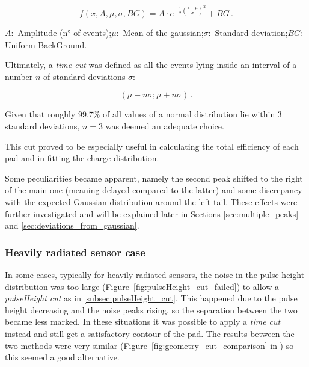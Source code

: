 \begin{equation*}
    f(x,A,\mu,\sigma,BG) = A \cdot e^{-\frac{1}{2}\left(\frac{x-\mu}{\sigma} \right)^2} + BG  \, .
\end{equation*}

\(A:\) Amplitude (n° of events);\quad \(\mu:\) Mean of the gaussian;\quad \(\sigma:\) Standard deviation;\quad \(BG:\) Uniform BackGround.

Ultimately, a \textit{time cut} was defined as all the events lying inside an interval of a number \(n\) of standard deviations \(\sigma\):

\begin{equation}
    (\mu-n\sigma;\mu+n\sigma) \, .
\end{equation}

Given that roughly 99.7\% of all values of a normal distribution lie within 3 standard deviations, \(n=3\) was deemed an adequate choice.

This cut proved to be especially useful in calculating the total efficiency of each pad and in fitting the charge distribution.

Some peculiarities became apparent, namely the second peak shifted to the right of the main one (meaning delayed compared to the latter) and some discrepancy with the expected Gaussian distribution around the left tail. These effects were further investigated and will be explained later in Sections \ref{sec:multiple_peaks} and \ref{sec:deviations_from_gaussian}.

\subsubsection{Heavily radiated sensor case}\label{subsec:geometry_cut_w/pulse_cut}

In some cases, typically for heavily radiated sensors, the noise in the pulse height distribution was too large (Figure~\ref{fig:pulseHeight_cut_failed}) to allow a \textit{pulseHeight cut} as in \ref{subsec:pulseHeight_cut}. This happened due to the pulse height decreasing and the noise peaks rising, so the separation between the two became less marked. In these situations it was possible to apply a \textit{time cut} instead and still get a satisfactory contour of the pad. The results between the two methods were very similar (Figure~\ref{fig:geometry_cut_comparison} in ) so this seemed a good alternative.

